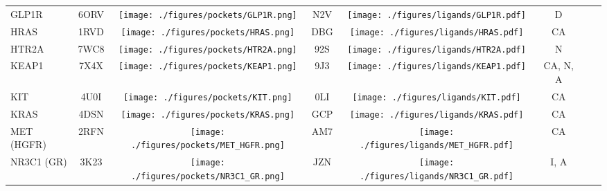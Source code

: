 \begin{ThreePartTable}
\begin{longtable}{l @{\extracolsep{\fill}} *{7}{c}}
GLP1R                                 & 6ORV            &      \texttt{[image: ./figures/pockets/GLP1R.png]}                     & N2V                    &\texttt{[image: ./figures/ligands/GLP1R.pdf]}                                               & D                                            \\
HRAS                                  & 1RVD            &       \texttt{[image: ./figures/pockets/HRAS.png]}                    & DBG                    &\texttt{[image: ./figures/ligands/HRAS.pdf]}                                              & CA                                              \\
HTR2A                                 & 7WC8            &      \texttt{[image: ./figures/pockets/HTR2A.png]}                     & 92S                    &\texttt{[image: ./figures/ligands/HTR2A.pdf]}                                               & N                             \\
KEAP1                                 & 7X4X            &      \texttt{[image: ./figures/pockets/KEAP1.png]}                     & 9J3                    &\texttt{[image: ./figures/ligands/KEAP1.pdf]}                                               & CA, N, A \\
KIT                                   & 4U0I            &      \texttt{[image: ./figures/pockets/KIT.png]}                     & 0LI                    &\texttt{[image: ./figures/ligands/KIT.pdf]}                                               & CA                                              \\
KRAS                                  & 4DSN            &      \texttt{[image: ./figures/pockets/KRAS.png]}                     & GCP                    &\texttt{[image: ./figures/ligands/KRAS.pdf]}                                               & CA                                              \\
MET (HGFR)                            & 2RFN            &      \texttt{[image: ./figures/pockets/MET\_HGFR.png]}                     & AM7                    &\texttt{[image: ./figures/ligands/MET\_HGFR.pdf]}                                               & CA                                              \\
NR3C1 (GR)                            & 3K23            &        \texttt{[image: ./figures/pockets/NR3C1\_GR.png]}                   & JZN                    &\texttt{[image: ./figures/ligands/NR3C1\_GR.pdf]}                                             & I, A              \\

\end{longtable}
\end{ThreePartTable}
